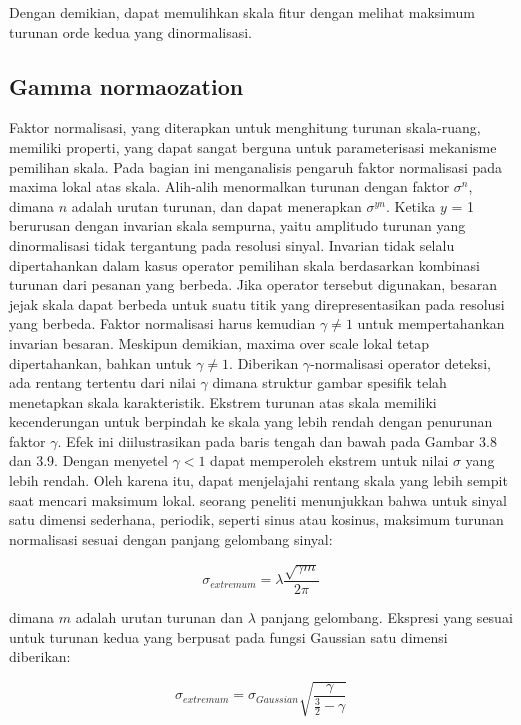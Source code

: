Dengan demikian, dapat memulihkan skala fitur dengan melihat maksimum turunan orde kedua yang dinormalisasi.

\subsection{Gamma normaozation}
Faktor normalisasi, yang diterapkan untuk menghitung turunan skala-ruang, memiliki properti, yang dapat sangat 
berguna untuk parameterisasi mekanisme pemilihan skala. Pada bagian ini menganalisis pengaruh faktor 
normalisasi pada maxima lokal atas skala. Alih-alih menormalkan turunan dengan faktor \(\sigma^{n}\), 
dimana \(n\) adalah urutan turunan, dan dapat menerapkan \(\sigma^{yn}\). Ketika \(y\) = 1 berurusan 
dengan invarian skala sempurna, yaitu amplitudo turunan yang dinormalisasi tidak tergantung pada resolusi sinyal. 
Invarian tidak selalu dipertahankan dalam kasus operator pemilihan skala berdasarkan kombinasi turunan dari pesanan yang berbeda.
Jika operator tersebut digunakan, besaran jejak skala dapat berbeda untuk suatu titik yang direpresentasikan pada resolusi yang berbeda. 
Faktor normalisasi harus kemudian \(\gamma \neq 1\) untuk mempertahankan invarian besaran. Meskipun demikian, maxima over scale lokal tetap 
dipertahankan, bahkan untuk \(\gamma \neq 1\). Diberikan \(\gamma\)-normalisasi operator deteksi, ada rentang tertentu dari nilai \(\gamma\) 
dimana struktur gambar spesifik telah menetapkan skala karakteristik.
Ekstrem turunan atas skala memiliki kecenderungan untuk berpindah ke skala yang lebih rendah dengan penurunan faktor \(\gamma\). Efek ini diilustrasikan pada baris tengah dan bawah pada Gambar 3.8 dan 3.9. Dengan menyetel \(\gamma < 1\) dapat memperoleh ekstrem untuk nilai \(\sigma\) yang lebih rendah. 
Oleh karena itu, dapat menjelajahi rentang skala yang lebih sempit saat mencari maksimum lokal. seorang peneliti menunjukkan bahwa untuk 
sinyal satu dimensi sederhana, periodik, seperti sinus atau kosinus, maksimum turunan normalisasi sesuai dengan panjang gelombang sinyal:

\begin{equation}
  \sigma_{extremum} = \lambda \frac{\sqrt{\gamma m} }{2\pi }
\end{equation}

dimana \(m\) adalah urutan turunan dan \(\lambda\) panjang gelombang. Ekspresi yang sesuai untuk turunan kedua yang berpusat pada fungsi Gaussian satu dimensi diberikan:

\begin{equation}
  \sigma_{extremum} = \sigma_{Gaussian} \sqrt{\frac{\gamma}{\frac{3}{2}- \gamma}}
\end{equation}

